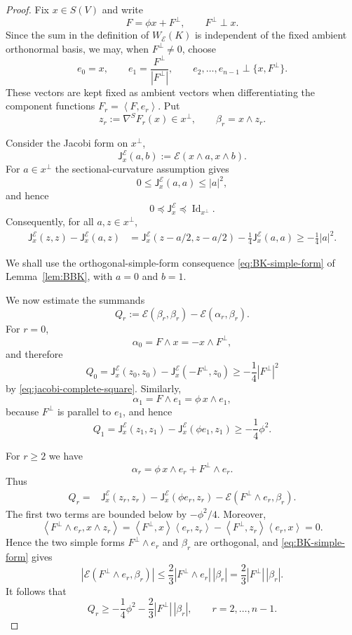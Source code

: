 \documentclass[10pt,a4paper]{amsart}
\newcommand{\Id}{\operatorname{Id}}
\newcommand{\cE}{\mathcal E}
\newcommand{\inner}[2]{\left\langle #1,#2\right\rangle}
\begin{document}
\begin{proof}
Fix $x\in S(V)$ and write
$$
  F=\phi x+F^\perp,
  \qquad
  F^\perp\perp x.
$$
Since the sum in the definition of $W_{\cE}(K)$ is independent of the
fixed ambient orthonormal basis, we may, when $F^\perp\neq0$, choose
$$
  e_0=x,
  \qquad
  e_1=\frac{F^\perp}{|F^\perp|},
  \qquad
  e_2,\ldots,e_{n-1}\perp\{x,F^\perp\}.
$$
These vectors are kept fixed as ambient vectors when differentiating the
component functions $F_r=\inner{F}{e_r}$. Put
$$
  z_r:=\nabla^S F_r(x)\in x^\perp,
  \qquad
  \beta_r=x\wedge z_r.
$$

Consider the Jacobi form on $x^\perp$,
$$
  \mathsf J_x^{\cE}(a,b)
  :=\cE(x\wedge a,x\wedge b).
$$
For $a\in x^\perp$ the sectional-curvature assumption gives
$$
  0\leq\mathsf J_x^{\cE}(a,a)\leq |a|^2,
$$
and hence
$$
  0\preceq\mathsf J_x^{\cE}\preceq\Id_{x^\perp}.
$$
Consequently, for all $a,z\in x^\perp$,
\begin{align}
  \mathsf J_x^{\cE}(z,z)-\mathsf J_x^{\cE}(a,z)
  &=
  \mathsf J_x^{\cE}(z-a/2,z-a/2)
  -\frac14\mathsf J_x^{\cE}(a,a) \geq-\frac14|a|^2.
  \label{eq:jacobi-complete-square}
\end{align}

We shall use the orthogonal-simple-form consequence
\eqref{eq:BK-simple-form} of Lemma~\ref{lem:BBK}, with $a=0$ and $b=1$.

We now estimate the summands
$$
  Q_r:=\cE(\beta_r,\beta_r)-\cE(\alpha_r,\beta_r).
$$
For $r=0$,
$$
  \alpha_0=F\wedge x=-x\wedge F^\perp,
$$
and therefore
$$
  Q_0
  =\mathsf J_x^{\cE}(z_0,z_0)
   -\mathsf J_x^{\cE}(-F^\perp,z_0)
  \geq-\frac14|F^\perp|^2
$$
by \eqref{eq:jacobi-complete-square}. Similarly,
$$
  \alpha_1=F\wedge e_1=\phi\,x\wedge e_1,
$$
because $F^\perp$ is parallel to $e_1$, and hence
$$
  Q_1
  =\mathsf J_x^{\cE}(z_1,z_1)
   -\mathsf J_x^{\cE}(\phi e_1,z_1)
  \geq-\frac14\phi^2.
$$

For $r\geq2$ we have
$$
  \alpha_r=\phi\,x\wedge e_r+F^\perp\wedge e_r.
$$
Thus
\begin{align*}
  Q_r
  ={}&
  \mathsf J_x^{\cE}(z_r,z_r)
  -\mathsf J_x^{\cE}(\phi e_r,z_r)
  -\cE(F^\perp\wedge e_r,\beta_r).
\end{align*}
The first two terms are bounded below by $-\phi^2/4$. Moreover,
$$
  \inner{F^\perp\wedge e_r}{x\wedge z_r}
  =
  \inner{F^\perp}{x}\inner{e_r}{z_r}
  -\inner{F^\perp}{z_r}\inner{e_r}{x}
  =0.
$$
Hence the two simple forms $F^\perp\wedge e_r$ and $\beta_r$ are
orthogonal, and \eqref{eq:BK-simple-form} gives
$$
  |\cE(F^\perp\wedge e_r,\beta_r)|
  \leq\frac23|F^\perp\wedge e_r|\,|\beta_r|
  =\frac23|F^\perp|\,|\beta_r|.
$$
It follows that
$$
  Q_r\geq-\frac14\phi^2
  -\frac23|F^\perp|\,|\beta_r|,
  \qquad r=2,\ldots,n-1.
$$


\end{proof}
\end{document}
